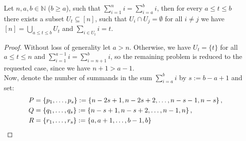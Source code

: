 \begin{thm}\label{theorem11}
Let \(n,a,b\in\mathbb{N}\) (\(b\geq a\)), such that \(\sum\limits_{i=1}^ni=\sum\limits_{i=a}^bi\), then for every \(a\leq t\leq b\) there exists a subset \(U_t\subseteq [n]\), such that \(U_i\cap U_j=\emptyset\) for all \(i\neq j\) we have\\
\([n]=\bigcup\limits_{a\leq t\leq b}U_t\) and \(\sum\limits_{i\in U_t}i=t\).
\begin{proof}
Without loss of generality let \(a>n\). Otherwise, we have \(U_t=\{t\}\) for all \(a\leq t\leq n\) and \(\sum\limits_{i=1}^{a-1}i=\sum\limits_{i=n+1}^bi\), so the remaining problem is reduced to the requested case, since we have \(n+1>a-1\).\\
Now, denote the number of summands in the sum \(\sum\limits_{i=a}^bi\) by \(s:=b-a+1\) and set:
\begin{align}
P&=\left\{p_1,\ldots,p_s\right\}:=\left\{n-2s+1,n-2s+2,\ldots,n-s-1,n-s\right\},\notag\\
Q&=\left\{q_1,\ldots,q_s\right\}:=\left\{n-s+1,n-s+2,\ldots,n-1,n\right\},\notag\\
R&=\left\{r_1,\ldots,r_s\right\}:=\left\{a,a+1,\ldots,b-1,b\right\}\notag
\end{align}

\end{proof}
\end{thm}
